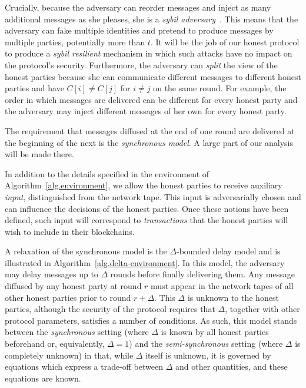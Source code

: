 Crucially, because the adversary can reorder messages and inject as many
additional messages as she pleases, she is a
\emph{sybil adversary}~\cite{sybil}. This means that the adversary can fake
multiple identities and pretend to produce messages by multiple parties,
potentially more than $t$. It will be the job of our honest protocol to produce
a \emph{sybil resilient} mechanism in which such attacks have no impact on the
protocol's security. Furthermore, the adversary can \emph{split} the view of the
honest parties because she can communicate different messages to different
honest parties and have $C[i] \neq C[j]$ for $i \neq j$ on the same round. For example, the order in which messages are delivered can be
different for every honest party and the adversary may inject different messages
of her own for every honest party.

The requirement that messages diffused at the end of one round are delivered at
the beginning of the next is the \emph{synchronous model}. A
large part of our analysis will be made there.

In addition to the details specified in the environment of
Algorithm~\ref{alg.environment}, we allow the honest parties to receive
auxiliary \emph{input}, distinguished from the network tape. This input is
adversarially chosen and can influence the decisions of the honest parties. Once
these notions have been defined, such input will correspond to
\emph{transactions} that the honest parties will wish to include in their
blockchains.



A relaxation of the synchronous model is the $\Delta$-bounded
delay model and is illustrated in Algorithm~\ref{alg.delta-environment}. In this model, the adversary may
delay messages up to $\Delta$ rounds before finally delivering them. Any message
diffused by any honest party at round $r$ must appear in the network tapes of
all other honest parties prior to round $r + \Delta$. This $\Delta$ is unknown
to the honest parties, although the security of the protocol requires that
$\Delta$, together with other protocol parameters, satisfies a number of
conditions. As such, this model stands between the \emph{synchronous} setting
(where $\Delta$ is known by all honest parties beforehand or, equivalently,
$\Delta = 1$) and the \emph{semi-synchronous} setting (where $\Delta$ is
completely unknown) in that, while $\Delta$ itself is unknown, it is governed by
equations which express a trade-off between $\Delta$ and other quantities, and
these equations are known.

